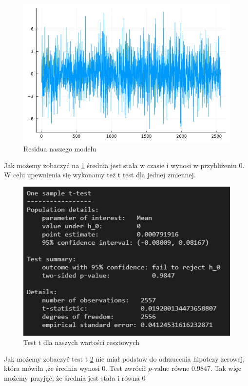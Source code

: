 \documentclass[12pt]{article}
\theoremstyle{exer}
\begin{document}
	\begin{figure}[H]
	\centering
	\includegraphics[width=3\columnwidth/4]{img/residua.png}
	\caption{Residua naszego modelu}
	\label{fig:residua}
\end{figure}
 Jak możemy zobaczyć na \ref{fig:residua} średnia jest stała w czasie i wynosi w przybliżeniu $0$. 
 W celu upewnienia się wykonamy też t test dla jednej zmiennej.
 	\begin{figure}[H]
 	\centering
 	\includegraphics[width=3\columnwidth/4]{img/t_test.png}
 	\caption{Test t dla naszych wartości resztowych}
 	\label{t_test}
 \end{figure}
Jak możemy zobaczyć test t \ref{t_test} nie miał podstaw do odrzucenia hipotezy zerowej, która mówiła ,że średnia wynosi $0$. Test zwrócił $p$-value równe $0.9847$.
Tak więc możemy przyjąć, że średnia jest stała i równa $0$
\end{document}
